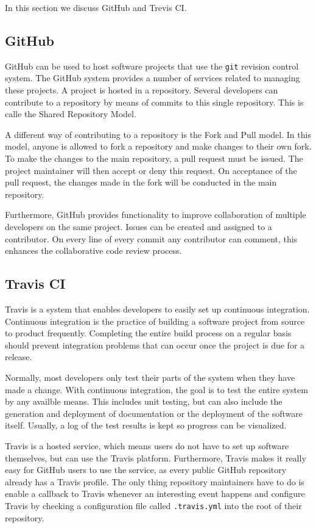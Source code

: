 In this section we discuss GitHub and Trevis CI.

\subsection{GitHub}
GitHub can be used to host software projects that use the \texttt{git} revision control system. 
The GitHub system provides a number of services related to managing these projects. 
A project is hosted in a repository. 
Several developers can contribute to a repository by means of commits to this single repository.
This is calle the Shared Repository Model.
 
A different way of contributing to a repository is the Fork and Pull model.
In this model, anyone is allowed to fork a repository and make changes to their own fork.
To make the changes to the main repository, a pull request must be issued.
The project maintainer will then accept or deny this request.
On acceptance of the pull request, the changes made in the fork will be conducted in the main repository.

Furthermore, GitHub provides functionality to improve collaboration of multiple developers on the same project.
Issues can be created and assigned to a contributor. 
On every line of every commit any contributor can comment, this enhances the collaborative code review process.

\subsection{Travis CI}
Travis is a system that enables developers to easily set up continuous integration.
Continuous integration is the practice of building a software project from source to product frequently.
Completing the entire build process on a regular basis should prevent integration problems that can occur once the project is due for a release.

Normally, most developers only test their parts of the system when they have made a change.
With continuous integration, the goal is to test the entire system by any availble means.
This includes unit testing, but can also include the generation and deployment of documentation or the deployment of the software itself.
Usually, a log of the test results is kept so progress can be visualized.

Travis is a hosted service, which means users do not have to set up software themselves, but can use the Travis platform.
Furthermore, Travis makes it really easy for GitHub users to use the service, as every public GitHub repository already has a Travis profile.
The only thing repository maintainers have to do is enable a callback to Travis whenever an interesting event happens and configure Travis by checking a configuration file called \texttt{.travis.yml} into the root of their repository.

